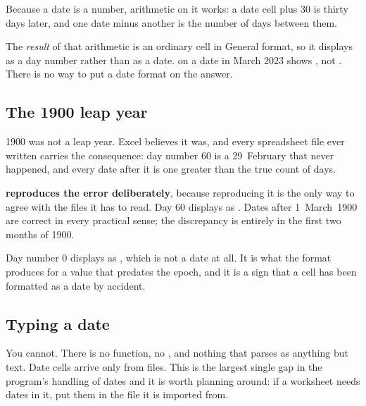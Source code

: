 Because a date is a number, arithmetic on it works: a date cell plus 30 is
thirty days later, and one date minus another is the number of days between
them.

\begin{cccaution}
The \emph{result} of that arithmetic is an ordinary cell in General format, so
it displays as a day number rather than as a date.  on a date in
March 2023 shows , not . There is no way to put a
date format on the answer.
\end{cccaution}

\subsection{The 1900 leap year}

\begin{ccnote}
1900 was not a leap year. Excel believes it was, and every spreadsheet file
ever written carries the consequence: day number 60 is a 29~February that never
happened, and every date after it is one greater than the true count of days.

\ccprod{} \textbf{reproduces the error deliberately}, because reproducing it is
the only way to agree with the files it has to read. Day 60 displays as
. Dates after 1~March~1900 are correct in every practical
sense; the discrepancy is entirely in the first two months of 1900.
\end{ccnote}

Day number 0 displays as , which is not a date at all. It is
what the format produces for a value that predates the epoch, and it is a sign
that a cell has been formatted as a date by accident.

\subsection{Typing a date}

You cannot. There is no  function, no , and nothing that
parses  as anything but text. Date cells arrive only from
files. This is the largest single gap in the program's handling of dates and it
is worth planning around: if a worksheet needs dates in it, put them in the
file it is imported from.
